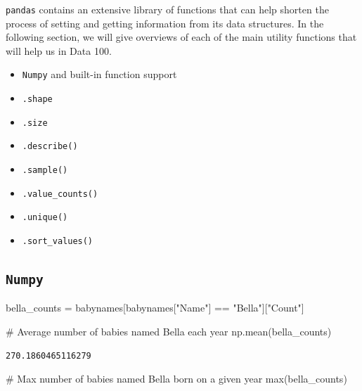 \documentclass[
  letterpaper,
  DIV=11,
  numbers=noendperiod]{scrreprt}
\newenvironment{Shaded}{\begin{snugshade}}{\end{snugshade}}
\newcommand{\BuiltInTok}[1]{\textcolor[rgb]{0.00,0.23,0.31}{#1}}
\newcommand{\CommentTok}[1]{\textcolor[rgb]{0.37,0.37,0.37}{#1}}
\newcommand{\NormalTok}[1]{\textcolor[rgb]{0.00,0.23,0.31}{#1}}
\newcommand{\OperatorTok}[1]{\textcolor[rgb]{0.37,0.37,0.37}{#1}}
\newcommand{\StringTok}[1]{\textcolor[rgb]{0.13,0.47,0.30}{#1}}
\providecommand{\tightlist}{%
  \setlength{\itemsep}{0pt}\setlength{\parskip}{0pt}}\usepackage{longtable,booktabs,array}
\begin{document}
\texttt{pandas} contains an extensive library of functions that can help
shorten the process of setting and getting information from its data
structures. In the following section, we will give overviews of each of
the main utility functions that will help us in Data 100.

\begin{itemize}
\tightlist
\item
  \texttt{Numpy} and built-in function support
\item
  \texttt{.shape}
\item
  \texttt{.size}
\item
  \texttt{.describe()}
\item
  \texttt{.sample()}
\item
  \texttt{.value\_counts()}
\item
  \texttt{.unique()}
\item
  \texttt{.sort\_values()}
\end{itemize}

\hypertarget{numpy}{%
\subsection{\texorpdfstring{\texttt{Numpy}}{Numpy}}\label{numpy}}

\begin{Shaded}
\begin{Highlighting}[]
\NormalTok{bella\_counts }\OperatorTok{=}\NormalTok{ babynames[babynames[}\StringTok{"Name"}\NormalTok{] }\OperatorTok{==} \StringTok{"Bella"}\NormalTok{][}\StringTok{"Count"}\NormalTok{]}
\end{Highlighting}
\end{Shaded}

\begin{Shaded}
\begin{Highlighting}[]
\CommentTok{\# Average number of babies named Bella each year}
\NormalTok{np.mean(bella\_counts)}
\end{Highlighting}
\end{Shaded}

\begin{verbatim}
270.1860465116279
\end{verbatim}

\begin{Shaded}
\begin{Highlighting}[]
\CommentTok{\# Max number of babies named Bella born on a given year}
\BuiltInTok{max}\NormalTok{(bella\_counts)}
\end{Highlighting}
\end{Shaded}
\end{document}
